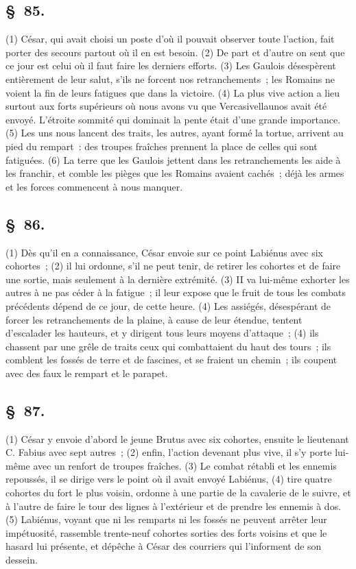 \documentclass[french,twoside]{book} %
\begin{document}
\subsection[{§ 85.}]{ \textsc{§ 85.} }
\noindent (1) César, qui avait choisi un poste d’où il pouvait observer toute l’action, fait porter des secours partout où il en est besoin. (2) De part et d’autre on sent que ce jour est celui où il faut faire les derniers efforts. (3) Les Gaulois désespèrent entièrement de leur salut, s’ils ne forcent nos retranchements ; les Romains ne voient la fin de leurs fatigues que dans la victoire. (4) La plus vive action a lieu surtout aux forts supérieurs où nous avons vu que Vercasivellaunos avait été envoyé. L'étroite sommité qui dominait la pente était d’une grande importance. (5) Les uns nous lancent des traits, les autres, ayant formé la tortue, arrivent au pied du rempart : des troupes fraîches prennent la place de celles qui sont fatiguées. (6) La terre que les Gaulois jettent dans les retranchements les aide à les franchir, et comble les pièges que les Romains avaient cachés ; déjà les armes et les forces commencent à nous manquer.
\subsection[{§ 86.}]{ \textsc{§ 86.} }
\noindent (1) Dès qu’il en a connaissance, César envoie sur ce point Labiénus avec six cohortes ; (2) il lui ordonne, s’il ne peut tenir, de retirer les cohortes et de faire une sortie, mais seulement à la dernière extrémité. (3) II va lui-même exhorter les autres à ne pas céder à la fatigue ; il leur expose que le fruit de tous les combats précédents dépend de ce jour, de cette heure. (4) Les assiégés, désespérant de forcer les retranchements de la plaine, à cause de leur étendue, tentent d’escalader les hauteurs, et y dirigent tous leurs moyens d’attaque ; (4) ils chassent par une grêle de traits ceux qui combattaient du haut des tours ; ils comblent les fossés de terre et de fascines, et se fraient un chemin ; ils coupent avec des faux le rempart et le parapet.
\subsection[{§ 87.}]{ \textsc{§ 87.} }
\noindent (1) César y envoie d’abord le jeune Brutus avec six cohortes, ensuite le lieutenant C. Fabius avec sept autres ; (2) enfin, l’action devenant plus vive, il s’y porte lui-même avec un renfort de troupes fraîches. (3) Le combat rétabli et les ennemis repoussés, il se dirige vers le point où il avait envoyé Labiénus, (4) tire quatre cohortes du fort le plus voisin, ordonne à une partie de la cavalerie de le suivre, et à l’autre de faire le tour des lignes à l’extérieur et de prendre les ennemis à dos. (5) Labiénus, voyant que ni les remparts ni les fossés ne peuvent arrêter leur impétuosité, rassemble trente-neuf cohortes sorties des forts voisins et que le hasard lui présente, et dépêche à César des courriers qui l’informent de son dessein.
\end{document}
